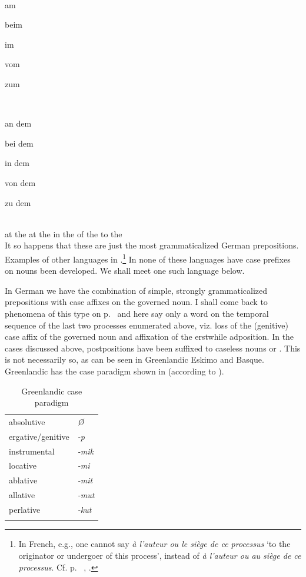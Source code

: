 \ea\label{ex:E57} %
\langinfo{\LangGerm}{}{}\\
 \ea \parbox{\examplewidth}{am} \parbox{\examplewidth}{beim} \parbox{\examplewidth}{im} \parbox{\examplewidth}{vom} \parbox{\examplewidth}{zum}\\
\ex 
\gll \parbox{\examplewidth}{an dem} \parbox{\examplewidth}{bei dem} \parbox{\examplewidth}{in dem} \parbox{\examplewidth}{von dem} \parbox{\examplewidth}{zu dem}\\
  {at the}  {at the}   {in the}   {of the}  {to the}\\
\z
\z
\noindent It so happens that these are just the most grammaticalized German prepositions. Examples of other languages in \citet[135--140]{Kahr1976}.\footnote{In French, e.g., one cannot say \textit{à l'auteur ou le siège de ce processus} ‘to the originator or undergoer of this process’, instead of \textit{à l'auteur ou au siège de ce processus}. Cf. p.~\pageref{ex:E106}\chkfn%
, .} In none of these languages have case prefixes on nouns been developed. We shall meet one such language below.

In German we have the combination of simple, strongly grammaticalized pre\-positions with case affixes on the governed noun. I shall come back to phenomena of this type on p.~\pageref{page99}\chk%
 and here say only a word on the temporal sequence of the last two processes enumerated above, viz. loss of the (genitive) case affix of the governed noun and affixation of the erstwhile adposition. In the cases discussed above, postpositions have been suffixed to caseless nouns or \nps. This is not necessarily so, as can be seen in Greenlandic Eskimo and Basque. Greenlandic has the case paradigm shown in  (according to \citealt[310]{Woodbury1977}).

\begin{table}
\begin{tabular}{ll}
\lsptoprule

absolutive & \itshape Ø\\
ergative/genitive & \itshape {}-p\\
instrumental & \itshape {}-mik\\
locative & \itshape {}-mi\\
ablative & \itshape {}-mit\\
allative & \itshape {}-mut\\
perlative & \itshape {}-kut\\
\lspbottomrule
\end{tabular}
\caption{Greenlandic case paradigm} \label{tab:Greenlandic}
\end{table}

